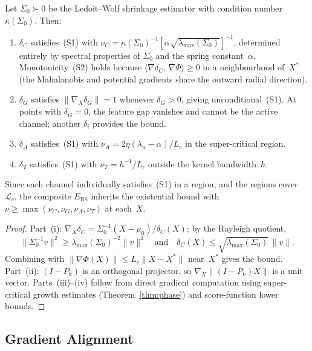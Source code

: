 \documentclass[final]{siamltex}
\newcommand{\norm}[1]{\lVert #1 \rVert}
\newcommand{\inner}[2]{\langle #1,\, #2 \rangle}
\providecommand{\grad}{\nabla}
\newcommand{\Ebs}{E_{\mathrm{BS}}}
\newcommand{\Xst}{X^*}
\newcommand{\lmax}{\lambda_{\max}}
\begin{document}
\begin{proposition}\label{prop:separation}
Let $\Sigma_0\succ 0$ be the Ledoit--Wolf shrinkage estimator
with condition number $\kappa(\Sigma_0)$. Then:
\begin{enumerate}
\item[\textup{(i)}] $\delta_C$ satisfies~(S1) with $\nu_C=
  \kappa(\Sigma_0)^{-1}[\alpha\sqrt{\lmax(\Sigma_0)}]^{-1}$,
  determined entirely by spectral properties of $\Sigma_0$ and the
  spring constant~$\alpha$. Monotonicity~(S2) holds because
  $\inner{\grad\delta_C}{\grad\Phi}\ge 0$ in a neighbourhood
  of~$\Xst$ (the Mahalanobis and potential gradients share the
  outward radial direction).

\item[\textup{(ii)}] $\delta_G$ satisfies $\norm{\grad_X\delta_G}=1$
  whenever $\delta_G>0$, giving unconditional~(S1). At points
  with $\delta_G=0$, the feature gap vanishes and cannot be the
  active channel; another $\delta_i$ provides the bound.

\item[\textup{(iii)}] $\delta_A$ satisfies~(S1)
  with $\nu_A=2\eta(\lambda_u-\alpha)/L_c$ in the super-critical
  region.

\item[\textup{(iv)}] $\delta_T$ satisfies~(S1)
  with $\nu_T=h^{-1}/L_c$ outside the kernel bandwidth~$h$.
\end{enumerate}
Since each channel individually satisfies~(S1) in a region,
and the regions cover $\mathcal{L}_c$, the composite $\Ebs$
inherits the existential bound with
$\nu\ge\max(\nu_C,\nu_G,\nu_A,\nu_T)$ at each~$X$.
\end{proposition}

\begin{proof}
Part~(i):
$\grad_X\delta_C=\Sigma_0^{-1}(X{-}\mu_0)/\delta_C(X)$;
by the Rayleigh quotient,
\[
  \norm{\Sigma_0^{-1}v}^2
  \ge \lmax(\Sigma_0)^{-2}\norm{v}^2
  \quad\text{and}\quad
  \delta_C(X)\le\sqrt{\lmax(\Sigma_0)}\,\norm{v}.
\]
Combining with
$\norm{\grad\Phi(X)}\le L_c\norm{X{-}\Xst}$ near~$\Xst$
gives the bound.
Part~(ii): $(I{-}P_k)$ is an orthogonal projector, so
$\grad_X\norm{(I{-}P_k)X}$ is a unit vector.
Parts~(iii)--(iv) follow from direct gradient computation
using super-critical growth estimates
(Theorem~\ref{thm:phase}) and score-function lower bounds.
\end{proof}

\subsection{Gradient Alignment}\label{sec:gradient}
\end{document}
